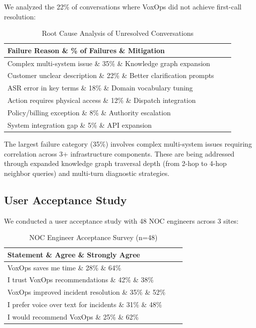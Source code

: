 \documentclass[conference,10pt]{IEEEtran}
\begin{document}
We analyzed the 22\% of conversations where VoxOps did not achieve first-call resolution:

\begin{table}[!htbp]
\caption{Root Cause Analysis of Unresolved Conversations}
\label{tab:failures}
\centering\scriptsize
\begin{tabular}{@{}lcc@{}}
\toprule
\textbf{Failure Reason} \& \textbf{\% of Failures} \& \textbf{Mitigation} \\
\midrule
Complex multi-system issue \& 35\% \& Knowledge graph expansion \\
Customer unclear description \& 22\% \& Better clarification prompts \\
ASR error in key terms \& 18\% \& Domain vocabulary tuning \\
Action requires physical access \& 12\% \& Dispatch integration \\
Policy/billing exception \& 8\% \& Authority escalation \\
System integration gap \& 5\% \& API expansion \\
\bottomrule
\end{tabular}
\end{table}

The largest failure category (35\%) involves complex multi-system issues requiring correlation across 3+ infrastructure components. These are being addressed through expanded knowledge graph traversal depth (from 2-hop to 4-hop neighbor queries) and multi-turn diagnostic strategies.

\subsection{User Acceptance Study}

We conducted a user acceptance study with 48 NOC engineers across 3 sites:

\begin{table}[!htbp]
\caption{NOC Engineer Acceptance Survey (n=48)}
\label{tab:acceptance}
\centering\scriptsize
\begin{tabular}{@{}lcc@{}}
\toprule
\textbf{Statement} \& \textbf{Agree} \& \textbf{Strongly Agree} \\
\midrule
VoxOps saves me time \& 28\% \& 64\% \\
I trust VoxOps recommendations \& 42\% \& 38\% \\
VoxOps improved incident resolution \& 35\% \& 52\% \\
I prefer voice over text for incidents \& 31\% \& 48\% \\
I would recommend VoxOps \& 25\% \& 62\% \\
\bottomrule
\end{tabular}
\end{table}
\end{document}

